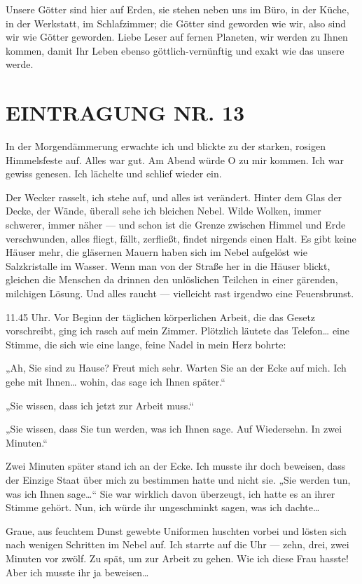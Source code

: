 Unsere Götter sind hier auf Erden, sie stehen
neben uns im Büro, in der Küche, in der Werkstatt, im Schlafzimmer;
die Götter sind geworden wie wir, also sind wir wie Götter
geworden. Liebe Leser auf fernen Planeten, wir werden zu Ihnen
kommen, damit Ihr Leben ebenso göttlich-vernünftig und exakt wie
das unsere werde.

\section{EINTRAGUNG NR. 13}

In der Morgendämmerung erwachte ich und blickte zu der starken,
rosigen Himmelsfeste auf. Alles war gut. Am Abend würde O zu mir
kommen. Ich war gewiss genesen. Ich lächelte und schlief wieder
ein.

Der Wecker rasselt, ich stehe auf, und alles ist verändert. Hinter
dem Glas der Decke, der Wände, überall sehe ich bleichen Nebel.
Wilde Wolken, immer schwerer, immer
näher — und schon ist die Grenze zwischen Himmel und Erde
verschwunden, alles fliegt, fällt, zerfließt, findet nirgends einen
Halt. Es gibt keine Häuser mehr, die gläsernen Mauern haben sich im
Nebel aufgelöst wie Salzkristalle im Wasser. Wenn man von der
Straße her in die Häuser blickt, gleichen die Menschen da drinnen
den unlöslichen Teilchen in einer gärenden, milchigen Lösung. Und
alles raucht — vielleicht rast irgendwo eine Feuersbrunst.

11.45 Uhr. Vor Beginn der täglichen körperlichen Arbeit, die das
Gesetz vorschreibt, ging ich rasch auf mein Zimmer. Plötzlich
läutete das Telefon\ldots{} eine Stimme, die sich wie eine lange, feine
Nadel in mein Herz bohrte:

„Ah, Sie sind zu Hause? Freut mich sehr.
Warten Sie an der Ecke auf mich. Ich gehe mit Ihnen\ldots{} wohin, das
sage ich Ihnen später.“

„Sie wissen, dass ich jetzt zur Arbeit muss.“

„Sie wissen, dass Sie tun werden, was ich Ihnen sage. Auf
Wiedersehn. In zwei Minuten.“

Zwei Minuten später stand ich an der Ecke. Ich musste ihr doch
beweisen, dass der Einzige Staat über mich zu bestimmen hatte und
nicht sie. „Sie werden tun, was ich Ihnen sage\ldots{}“ Sie war wirklich
davon überzeugt, ich hatte es an ihrer Stimme gehört. Nun, ich
würde ihr ungeschminkt sagen, was ich dachte\ldots{}

Graue, aus feuchtem
Dunst gewebte Uniformen huschten vorbei und lösten sich nach
wenigen Schritten im Nebel auf. Ich starrte auf die Uhr — zehn,
drei, zwei Minuten vor zwölf. Zu spät, um zur Arbeit zu gehen. Wie
ich diese Frau hasste! Aber ich musste ihr ja beweisen\ldots{}

